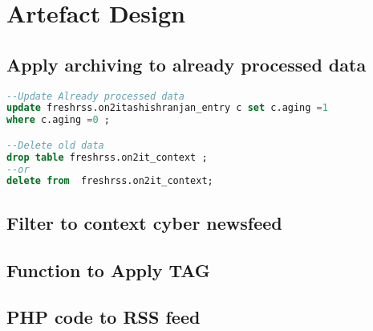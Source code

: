 
\chapter{Artefact Design} %

\label{AppendixChapter8} 
\label{AppendixD} %

\section{Apply archiving to already processed data}
\begin{lstlisting}[language=SQL]
--Update Already processed data
update freshrss.on2itashishranjan_entry c set c.aging =1 
where c.aging =0 ;

--Delete old data
drop table freshrss.on2it_context ; 
--or
delete from  freshrss.on2it_context;


\end{lstlisting}
\label{tag-archiving}
\clearpage

\section{Filter to context cyber newsfeed}

\label{filter-context}
\clearpage

\clearpage

\section{Function to Apply TAG}

\label{tag-addtag}
\clearpage
%
\section{PHP code to RSS feed}

\label{rss-send}
\clearpage
